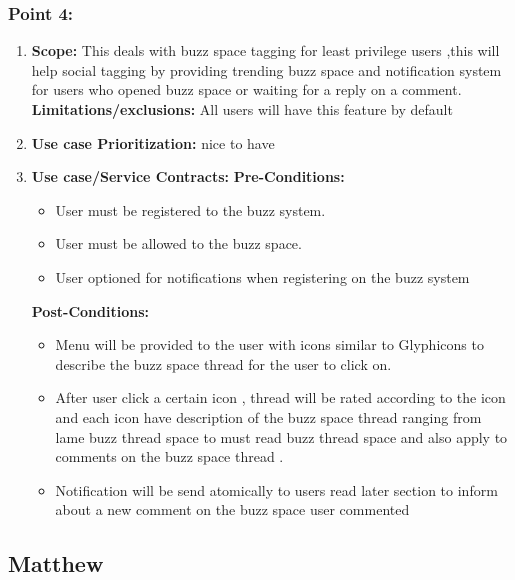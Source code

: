 \documentclass[11pt]{article}
\begin{document}
\subsubsection{Point 4:} 
\begin{enumerate}
\item 
\textbf{Scope:}
This deals with buzz space tagging for least privilege users ,this will help social tagging by providing trending buzz space and notification system for users who opened buzz space or waiting for a reply on a comment.
\newline
\textbf{Limitations/exclusions:} 
All users will have this feature by default
\item 
\textbf{Use case Prioritization:} nice to have

\item 
\textbf{Use case/Service Contracts:} 
\newline
\textbf{Pre-Conditions: }
\begin{itemize}
\item User must be registered to the buzz system.
\item User must be allowed to the buzz space.
\item User optioned for notifications when registering on the buzz system

\end{itemize}
 

\textbf{Post-Conditions: }
\begin{itemize}
\item Menu will be provided to the user with icons similar to Glyphicons to describe the buzz space thread for the user to click on.
\item After user click a certain icon , thread will be rated according to the icon and each icon have description of the buzz space thread ranging from lame buzz thread space to must read buzz thread space and also apply to comments on the buzz space thread .
\item Notification will be send atomically to users read later section to inform about a new comment on the buzz space user commented 
\end{itemize}
\end{enumerate}



\newpage




\subsection{Matthew}
\end{document}

